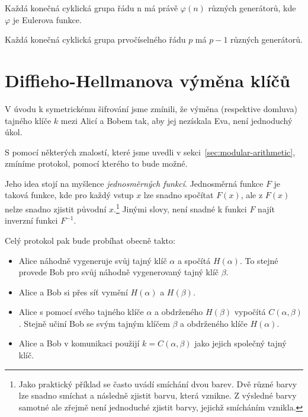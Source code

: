 \documentclass[
  program=infoi,
  biblatex,
  figures=false,
  glossaries,
  index
]{kidiplom}
\begin{document}
    \begin{theorem}\label{the:generators-count}
        Každá konečná cyklická grupa řádu n má právě $\varphi(n)$ různých generátorů, kde $\varphi$ je Eulerova funkce.
    \end{theorem}

    \begin{consequence}\label{con:generators-count}
        Každá konečná cyklická grupa prvočíselného řádu $p$ má $p-1$ různých generátorů.
    \end{consequence}



\section{Diffieho-Hellmanova výměna klíčů}\label{sec:diffie-hellman}


    V úvodu k symetrickému šifrování jsme zmínili, že výměna (respektive domluva)
    tajného klíče $k$ mezi Alicí a Bobem tak, aby jej nezískala Eva, není jednoduchý úkol.

    S pomocí některých znalostí, které jsme uvedli v sekci~\ref{sec:modular-arithmetic}, zmíníme protokol, pomocí kterého
    to bude možné.

    Jeho idea stojí na myšlence \emph{jednosměrných funkcí}. Jednosměrná funkce $F$ je taková funkce, kde pro každý vstup $x$ lze
    snadno spočítat $F(x)$, ale z $F(x)$ nelze snadno zjistit původní $x$.\footnote{Jako praktický příklad se často uvádí smíchání dvou barev.
    Dvě různé barvy lze snadno smíchat a následně zjistit barvu, která vznikne.
    Z výsledné barvy samotné ale zřejmě není jednoduché zjistit barvy, jejichž smícháním vznikla.}
    Jinými slovy, není snadné k funkci $F$ najít inverzní funkci $F^{-1}$.

    \medskip

    Celý protokol pak bude probíhat obecně takto:
    
    \begin{itemize}
        \item
            Alice náhodně vygeneruje svůj tajný klíč $\alpha$ a spočítá $H(\alpha)$.
            To stejné provede Bob pro svůj náhodně vygenerovaný tajný klíč $\beta$.
        \item
            Alice a Bob si přes síť vymění $H(\alpha)$ a $H(\beta)$.
        \item
            Alice s pomocí svého tajného klíče $\alpha$ a obdrženého $H(\beta)$ vypočítá $C(\alpha,\beta)$.
            Stejně učiní Bob se svým tajným klíčem $\beta$ a obdrženého klíče $H(\alpha)$.
        \item
            Alice a Bob v komunikaci použijí $k = C(\alpha,\beta)$ jako jejich společný tajný klíč.
    \end{itemize}
\end{document}
